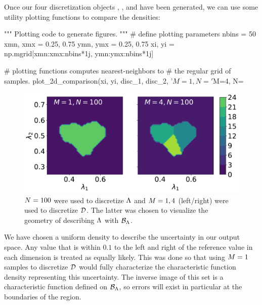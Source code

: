 Once our four discretization objects , ,  and  have been generated, we can use some utility plotting functions to compare the densities:

\begin{python}
"""
Plotting code to generate figures.
"""
# define plotting parameters
nbins = 50
xmn, xmx = 0.25, 0.75
ymn, ymx = 0.25, 0.75
xi, yi = np.mgrid[xmn:xmx:nbins*1j, ymn:ymx:nbins*1j]

# plotting functions computes nearest-neighbors to
# the regular grid of samples.
plot_2d_comparison(xi, yi, disc_1, disc_2,
                   '$M=1, N=%
                   '$M=4, N=%
\end{python}

\begin{figure}[ht]
\begin{minipage}{.975\textwidth}
  \includegraphics[width=\linewidth]{./examples/identity/set/M1-N100_N100-vs-M4-N100_N100.pdf}
\end{minipage}
\caption{
$N=100$ were used to discretize ${\Lambda}$ and $M=1, 4$ (left/right) were used to discretize $\mathcal{D}$.
The latter was chosen to visualize the geometry of describing ${\Lambda}$ with $\mathcal{B}_{{\Lambda}}$.
}
\label{fig:ex:identity_set_1E2}
\end{figure}

We have chosen a uniform density to describe the uncertainty in our output space.
Any value that is within $0.1$ to the left and right of the reference value  in each dimension is treated as equally likely.
This was done so that using $M = 1$ samples to discretize $\mathcal{D}$ would fully characterize the characteristic function density representing this uncertainty.
The inverse image of this set is a characteristic function defined on $\mathcal{B}_{{\Lambda}}$, so errors will exist in particular at the boundaries of the region.

